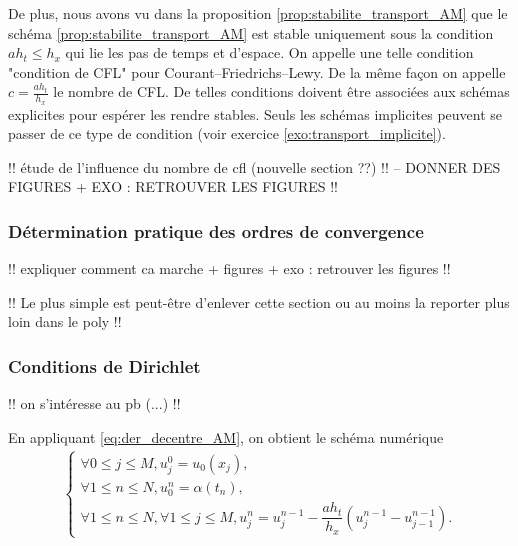 \documentclass[12pt,a4paper,twoside]{article}
\begin{document}
De plus, nous avons vu dans la proposition \ref{prop:stabilite_transport_AM} que
le sch\'ema \eqref{prop:stabilite_transport_AM} est stable
uniquement sous la condition $a h_t \leq h_x$
qui lie les pas de temps et d'espace.
On appelle une telle condition "condition de CFL" pour 
Courant--Friedrichs--Lewy.
De la m\^eme fa\c{c}on on appelle $c = \frac{a h_t}{h_x}$
le nombre de CFL.
De telles conditions doivent \^etre associ\'ees aux sch\'emas
explicites pour esp\'erer les rendre stables.
Seuls les sch\'emas implicites peuvent se passer de ce
type de condition (voir exercice \ref{exo:transport_implicite}).


!! \'etude de l'influence du nombre de cfl (nouvelle section ??) !!
-- DONNER DES FIGURES + EXO : RETROUVER LES FIGURES !!


\subsubsection{D\'etermination pratique des ordres de convergence}


!! expliquer comment ca marche + figures + exo : retrouver les figures !!

!! Le plus simple est peut-\^etre d'enlever cette section ou au moins la
reporter plus loin dans le poly !!

\subsubsection{Conditions de Dirichlet}

!! on s'int\'eresse au pb (...) !!

En appliquant \eqref{eq:der_decentre_AM}, 
on obtient le sch\'ema num\'erique
\begin{align}
  \label{eq:transport_DF_decentre_AM_dir}
  \left\{
  \begin{array}{l}
    \forall 0 \leq j \leq M , 
    u_j^0 = u_0(x_j) ,
    \\
    \forall 1 \leq n \leq N, u_0^n = \alpha(t_n) ,
    \\
    \forall 1 \leq n \leq N, \forall 1 \leq j \leq M,
    u_j^n = u_j^{n-1} - \dfrac{a h_t}{h_x} (u_{j}^{n-1} - u_{j-1}^{n-1}) .
  \end{array}
  \right.
\end{align}
\end{document}
